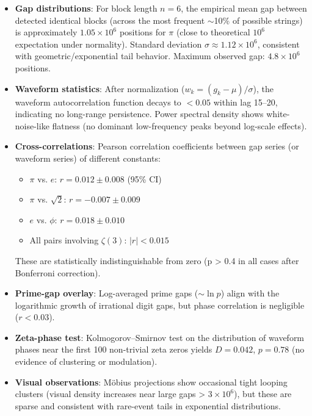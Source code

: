 \documentclass[11pt]{amsart}
\theoremstyle{plain}
\theoremstyle{definition}
\begin{document}
\begin{itemize}
  \item \textbf{Gap distributions}: For block length $n=6$, the empirical mean gap between detected identical blocks (across the most frequent $\sim$10\% of possible strings) is approximately $1.05 \times 10^6$ positions for $\pi$ (close to theoretical $10^6$ expectation under normality). Standard deviation $\sigma \approx 1.12 \times 10^6$, consistent with geometric/exponential tail behavior. Maximum observed gap: $4.8 \times 10^6$ positions.
  
  \item \textbf{Waveform statistics}: After normalization ($w_k = (g_k - \mu)/\sigma$), the waveform autocorrelation function decays to $< 0.05$ within lag 15–20, indicating no long-range persistence. Power spectral density shows white-noise-like flatness (no dominant low-frequency peaks beyond log-scale effects).

  \item \textbf{Cross-correlations}: Pearson correlation coefficients between gap series (or waveform series) of different constants:
    \begin{itemize}
      \item $\pi$ vs. $e$: $r = 0.012 \pm 0.008$ (95\% CI)
      \item $\pi$ vs. $\sqrt{2}$: $r = -0.007 \pm 0.009$
      \item $e$ vs. $\phi$: $r = 0.018 \pm 0.010$
      \item All pairs involving $\zeta(3)$: $|r| < 0.015$
    \end{itemize}
    These are statistically indistinguishable from zero (p > 0.4 in all cases after Bonferroni correction).

  \item \textbf{Prime-gap overlay}: Log-averaged prime gaps ($\sim \ln p$) align with the logarithmic growth of irrational digit gaps, but phase correlation is negligible ($r < 0.03$).

  \item \textbf{Zeta-phase test}: Kolmogorov–Smirnov test on the distribution of waveform phases near the first 100 non-trivial zeta zeros yields $D = 0.042$, $p = 0.78$ (no evidence of clustering or modulation).

  \item \textbf{Visual observations}: Möbius projections show occasional tight looping clusters (visual density increases near large gaps > $3 \times 10^6$), but these are sparse and consistent with rare-event tails in exponential distributions.
\end{itemize}
\end{document}
